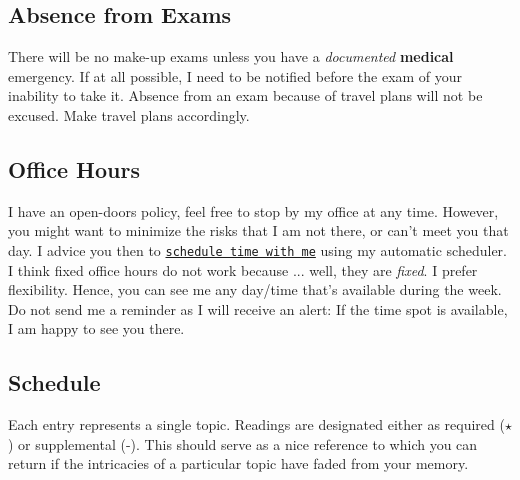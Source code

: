 \documentclass[letterpaper]{article}
\begin{document}
\subsection*{Absence from Exams}


There will be no make-up exams unless you have a \emph{documented} {\bf medical} emergency. If at all possible, I need to be notified before the exam of your inability to take it. Absence from an exam because of travel plans will not be excused. Make travel plans accordingly. 


\subsection*{Office Hours}

I have an open-doors policy, feel free to stop by my office at any time. However, you might want to minimize the risks that I am not there, or can't meet you that day. I advice you then to \href{https://calendly.com/bahamonde/officehours}{\texttt{schedule time with me}} using my automatic scheduler. I think fixed office hours do not work because ... well, they are \emph{fixed}. I prefer flexibility. Hence, you can see me any day/time that's available during the week. Do not send me a reminder as I will receive an alert: If the time spot is available, I am happy to see you there.



\subsection*{Schedule\label{schedule}}


Each entry represents a single topic. Readings are designated either as required ($\star$) or supplemental (-). This should serve as a nice reference to which you can return if the intricacies of a particular topic have faded from your memory.
\end{document}

